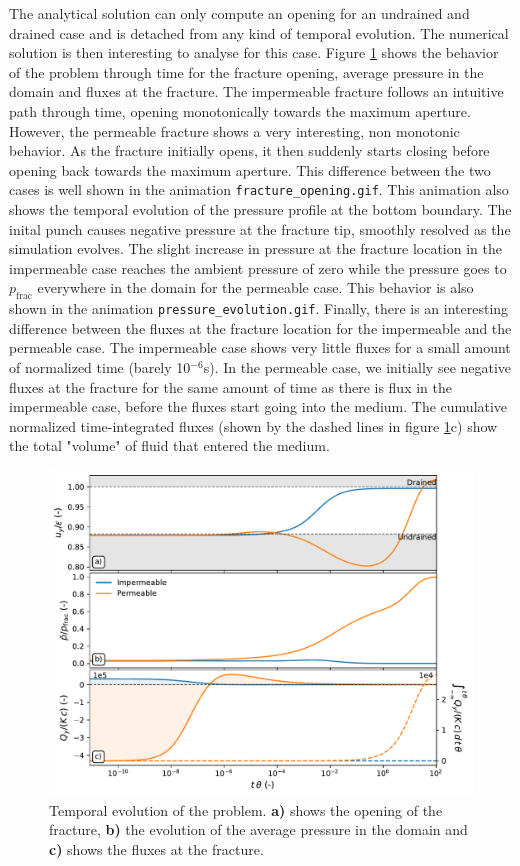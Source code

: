 \documentclass{article}
\begin{document}
The analytical solution can only compute an opening for an undrained and drained case and is detached from any kind of temporal evolution. The numerical solution is then interesting to analyse for this case. Figure \ref{fig:time} shows the behavior of the problem through time for the fracture opening, average pressure in the domain and fluxes at the fracture. The impermeable fracture follows an intuitive path through time, opening monotonically towards the maximum aperture. However, the permeable fracture shows a very interesting, non monotonic behavior. As the fracture initially opens, it then suddenly starts closing before opening back towards the maximum aperture. This difference between the two cases is well shown in the animation \texttt{fracture_opening.gif}. This animation also shows the temporal evolution of the pressure profile at the bottom boundary. The inital punch causes negative pressure at the fracture tip, smoothly resolved as the simulation evolves. The slight increase in pressure at the fracture location in the impermeable case reaches the ambient pressure of zero while the pressure goes to $p_{\text{frac}}$ everywhere in the domain for the permeable case. This behavior is also shown in the animation \texttt{pressure_evolution.gif}. Finally, there is an interesting difference between the fluxes at the fracture location for the impermeable and the permeable case. The impermeable case shows very little fluxes for a small amount of normalized time (barely 10$^{-6}$s). In the permeable case, we initially see negative fluxes at the fracture for the same amount of time as there is flux in the impermeable case, before the fluxes start going into the medium. The cumulative normalized time-integrated fluxes (shown by the dashed lines in figure \ref{fig:time}c) show the total "volume" of fluid that entered the medium.

\begin{figure}[h]
    \centering
    \includegraphics[width=1\textwidth]{../figures/time_behavior}
    \caption{Temporal evolution of the problem. \textbf{a)} shows the opening of the fracture, \textbf{b)} the evolution of the average pressure in the domain and \textbf{c)} shows the fluxes at the fracture.}
    \label{fig:time}
\end{figure}
\end{document}
